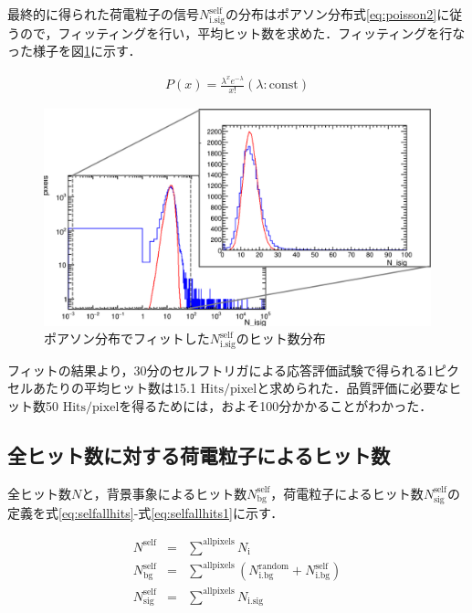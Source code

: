 最終的に得られた荷電粒子の信号$N_{\mathrm{i.sig}}^{\mathrm{self}}$の分布はポアソン分布式\ref{eq:poisson2}に従うので，フィッティングを行い，平均ヒット数を求めた．フィッティングを行なった様子を図\ref{fig:selffit}に示す．

\begin{eqnarray}
  \label{eq:poisson2}
  P(x) = \frac{\lambda^x e^{-\lambda}}{x!} (\lambda:\mathrm{const})
\end{eqnarray}

\begin{figure}[h]
  \centering
  \includegraphics[width=15cm]{./figure/selffit.png}
  \caption{ポアソン分布でフィットした$N_{\mathrm{i.sig}}^{\mathrm{self}}$のヒット数分布}
  \label{fig:selffit}
\end{figure}

フィットの結果より，30分のセルフトリガによる応答評価試験で得られる1ピクセルあたりの平均ヒット数は15.1 $\mathrm{Hits/pixel}$と求められた．品質評価に必要なヒット数50 $\mathrm{Hits/pixel}$を得るためには，およそ100分かかることがわかった．

\subsection*{全ヒット数に対する荷電粒子によるヒット数}
全ヒット数$N$と，背景事象によるヒット数$N_{\mathrm{bg}}^{\mathrm{self}}$，荷電粒子によるヒット数$N_{\mathrm{sig}}^{\mathrm{self}}$の定義を式\ref{eq:selfallhits}-式\ref{eq:selfallhits1}に示す．

\begin{eqnarray}
  \label{eq:selfallhits}
  N^{\mathrm{self}} &=& \sum^{\mathrm{allpixels}} N_{\mathrm{i}} \\
  N_{\mathrm{bg}}^{\mathrm{self}} &=& \sum^{\mathrm{allpixels}} \left(N_{\mathrm{i.bg}}^{\mathrm{random}} + N_{\mathrm{i.bg}}^{\mathrm{self}} \right) \\
  \label{eq:selfallhits1}
  N_{\mathrm{sig}}^{\mathrm{self}} &=& \sum^{\mathrm{allpixels}} N_{\mathrm{i.sig}}
\end{eqnarray}

